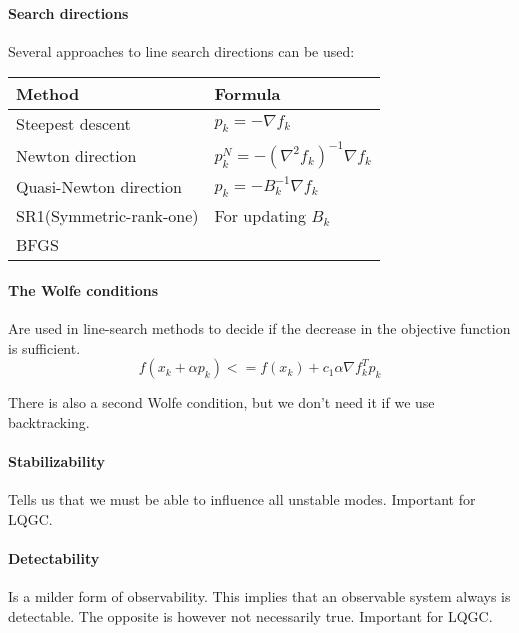 \paragraph{Search directions}  Several approaches to line search directions can be used:

\hskip-0.5cm
\begin{tabularx}{\linewidth}{X X}
	\textbf{Method} & \textbf{Formula}\\
	\hline
	Steepest descent & $p_k=-\nabla f_k$\\
	Newton direction & $p_k^N=-(\nabla^2 f_k)^{-1}\nabla f_k$ \\
	Quasi-Newton direction & $p_k=-B_k^{-1}\nabla f_k$ \\
	\quad SR1(Symmetric-rank-one) & For updating $B_k$\\
	\quad BFGS & \\
\end{tabularx}

\paragraph{The Wolfe conditions} 
Are used in line-search methods to decide if the decrease in the objective function is sufficient.
\begin{equation}
    f(x_k+\alpha p_k) <= f(x_k) + c_1 \alpha \nabla f_k^T p_k
\end{equation}

There is also a second Wolfe condition, but we don't need it if we use backtracking.

\paragraph{Stabilizability} 
Tells us that we must be able to influence all
unstable modes. Important for LQGC.

\paragraph{Detectability} 
Is a milder form of observability. This implies that an
observable system always is detectable. The opposite is however not
necessarily true. Important for LQGC.